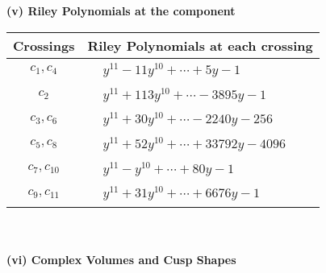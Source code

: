 \documentclass[1p]{elsarticle_modified}
\theoremstyle{definition}
\begin{document}
\newpage\renewcommand{\arraystretch}{1}
\flushleft \textbf{(v) Riley Polynomials at the component}\newline \\
\begin{tabular}{m{50pt}|m{274pt}}
Crossings & \hspace{64pt}Riley Polynomials at each crossing \\
\hline $$\begin{aligned}c_{1},c_{4}\end{aligned}$$&$\begin{aligned}
&y^{11}-11 y^{10}+\cdots+5 y-1
\end{aligned}$\\
\hline $$\begin{aligned}c_{2}\end{aligned}$$&$\begin{aligned}
&y^{11}+113 y^{10}+\cdots-3895 y-1
\end{aligned}$\\
\hline $$\begin{aligned}c_{3},c_{6}\end{aligned}$$&$\begin{aligned}
&y^{11}+30 y^{10}+\cdots-2240 y-256
\end{aligned}$\\
\hline $$\begin{aligned}c_{5},c_{8}\end{aligned}$$&$\begin{aligned}
&y^{11}+52 y^{10}+\cdots+33792 y-4096
\end{aligned}$\\
\hline $$\begin{aligned}c_{7},c_{10}\end{aligned}$$&$\begin{aligned}
&y^{11}- y^{10}+\cdots+80 y-1
\end{aligned}$\\
\hline $$\begin{aligned}c_{9},c_{11}\end{aligned}$$&$\begin{aligned}
&y^{11}+31 y^{10}+\cdots+6676 y-1
\end{aligned}$\\
\hline
\end{tabular}\\~\\
\newpage\flushleft \textbf{(vi) Complex Volumes and Cusp Shapes}
\end{document}
